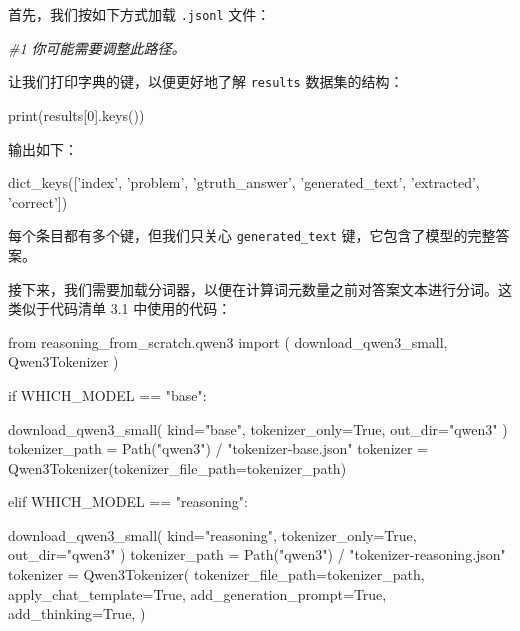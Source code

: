 首先，我们按如下方式加载 \texttt{.jsonl} 文件：

{\noindent\small\textit{\#1 你可能需要调整此路径。}\par}

让我们打印字典的键，以便更好地了解 \texttt{results} 数据集的结构：

\begin{codebox}
print(results[0].keys())
\end{codebox}

输出如下：

\begin{codebox}
dict_keys(['index', 'problem', 'gtruth_answer', 'generated_text',
'extracted', 'correct'])
\end{codebox}

每个条目都有多个键，但我们只关心 \texttt{generated\_text} 键，它包含了模型的完整答案。

接下来，我们需要加载分词器，以便在计算词元数量之前对答案文本进行分词。这类似于代码清单 3.1 中使用的代码：

\begin{codebox}
from reasoning_from_scratch.qwen3 import (
    download_qwen3_small,
    Qwen3Tokenizer
)

if WHICH_MODEL == "base":

    download_qwen3_small(
        kind="base", tokenizer_only=True, out_dir="qwen3"
    )
    tokenizer_path = Path("qwen3") / "tokenizer-base.json"
    tokenizer = Qwen3Tokenizer(tokenizer_file_path=tokenizer_path)

elif WHICH_MODEL == "reasoning":

    download_qwen3_small(
        kind="reasoning", tokenizer_only=True, out_dir="qwen3"
    )
    tokenizer_path = Path("qwen3") / "tokenizer-reasoning.json"
    tokenizer = Qwen3Tokenizer(
        tokenizer_file_path=tokenizer_path,
        apply_chat_template=True,
        add_generation_prompt=True,
        add_thinking=True,
    )
\end{codebox}

